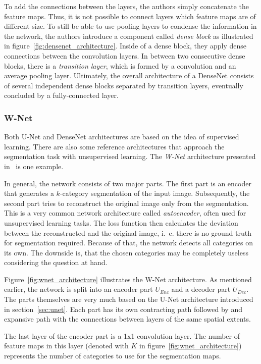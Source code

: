 To add the connections between the layers, the authors simply concatenate the feature maps. Thus, it is not possible to connect layers which feature maps are of different size. To still be able to use pooling layers to condense the information in the network, the authors introduce a component called \emph{dense block} as illustrated in figure~\ref{fig:densenet_architecture}. Inside of a dense block, they apply dense connections between the convolution layers. In between two consecutive dense blocks, there is a \emph{transition layer}, which is formed by a convolution and an average pooling layer. Ultimately, the overall architecture of a DenseNet consists of several independent dense blocks separated by transition layers, eventually concluded by a fully-connected layer.

\subsubsection{W-Net}
\label{sec:w-net}
Both U-Net and DenseNet architectures are based on the idea of supervised learning. There are also some reference architectures that approach the segmentation task with unsupervised learning. The \emph{W-Net} architecture presented in~\cite{wnet17} is one example.

In general, the network consists of two major parts. The first part is an encoder that generates a $k$-category segmentation of the input image. Subsequently, the second part tries to reconstruct the original image only from the segmentation. This is a very common network architecture called \emph{autoencoder}, often used for unsupervised learning tasks. The loss function then calculates the deviation between the reconstructed and the original image, i.~e. there is no ground truth for segmentation required. Because of that, the network detects all categories on its own. The downside is, that the chosen categories may be completely useless considering the question at hand.

Figure~\ref{fig:wnet_architecture} illustrates the W-Net architecture. As mentioned earlier, the network is split into an encoder part $U_{Enc}$ and a decoder part $U_{Dec}$. The parts themselves are very much based on the U-Net architecture introduced in section~\ref{sec:unet}. Each part has its own contracting path followed by and expansive path with the connections between layers of the same spatial extents.

The last layer of the encoder part is a 1x1 convolution layer. The number of feature maps in this layer (denoted with $K$ in figure~\ref{fig:wnet_architecture}) represents the number of categories to use for the segmentation maps.


